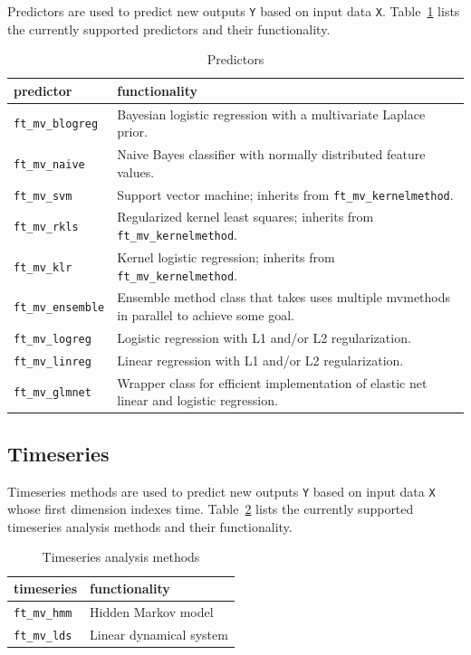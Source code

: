 \documentclass{article}
\renewcommand{\t}[1]{{\tt #1}}
\begin{document}
Predictors are used to predict new outputs \t{Y} based on input data \t{X}. Table~\ref{predictors} lists the currently supported predictors and their functionality.

\begin{table}[ht]
\centering
\caption{Predictors}
\begin{tabular}{p{}|p{}}
\bf{predictor} & \bf{functionality}\\
\hline
\t{ft\_mv\_blogreg} & Bayesian logistic regression with a multivariate Laplace prior.\\
\t{ft\_mv\_naive} & Naive Bayes classifier with normally distributed feature values.\\
\t{ft\_mv\_svm} & Support vector machine; inherits from \t{ft\_mv\_kernelmethod}.\\
\t{ft\_mv\_rkls} & Regularized kernel least squares; inherits from \t{ft\_mv\_kernelmethod}.\\
\t{ft\_mv\_klr}  &  Kernel logistic regression;  inherits from \t{ft\_mv\_kernelmethod}.\\
\t{ft\_mv\_ensemble} & Ensemble method class that takes uses multiple mvmethods in parallel to achieve some goal.\\
\t{ft\_mv\_logreg} & Logistic regression with L1 and/or L2 regularization.\\
\t{ft\_mv\_linreg} & Linear regression with L1 and/or L2 regularization.\\
\t{ft\_mv\_glmnet} & Wrapper class for efficient implementation of elastic net linear and logistic regression.
\end{tabular}
\label{predictors}
\end{table}

\subsection{Timeseries}

Timeseries methods are used to predict new outputs \t{Y} based on input data \t{X} whose first dimension indexes time. Table~\ref{timeseries} lists the currently supported timeseries analysis methods and their functionality.

\begin{table}[ht]
\centering
\caption{Timeseries analysis methods}
\begin{tabular}{p{}|p{}}
\bf{timeseries} & \bf{functionality}\\
\hline
\t{ft\_mv\_hmm} & Hidden Markov model\\
\t{ft\_mv\_lds} & Linear dynamical system
\end{tabular}
\label{timeseries}
\end{table}
\end{document}
